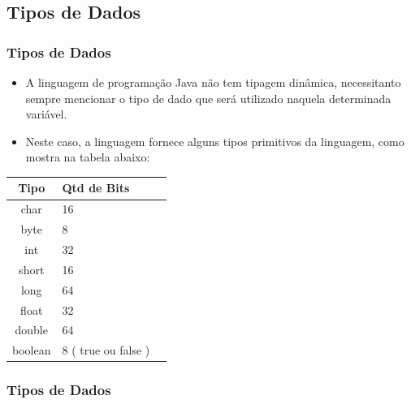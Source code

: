 \documentclass{beamer}
\begin{document}
\subsection{Tipos de Dados}
\begin{frame}
	\frametitle{Tipos de Dados}
	\begin{itemize}
		\item A linguagem de programação Java não tem tipagem dinâmica, necessitanto sempre mencionar o tipo de dado que será utilizado naquela determinada variável.
		\item Neste caso, a linguagem fornece alguns tipos primitivos da linguagem, como mostra na tabela abaixo:
	\end{itemize}
	\begin{table}
		\begin{tabular}{cl l}
			\toprule
			\textbf{Tipo} & \textbf{Qtd de Bits} \\
			\midrule
			char & 16 \\
			byte &  8 \\
			int & 32 \\
			short & 16 \\
			long & 64 \\
			float & 32 \\
			double & 64 \\
			boolean & 8 ( true ou false )\\
			\bottomrule
		\end{tabular}
	\end{table}
\end{frame}

\begin{frame}
	\frametitle{Tipos de Dados}
	\begin{example}
		\inputminted{java}{codigos/TiposDados01.java}
	\end{example}
\end{frame}
\end{document}
